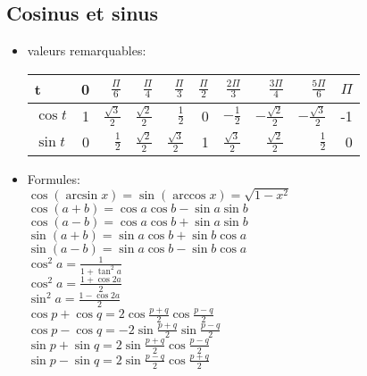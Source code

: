 \documentclass[fleqn]{article}
\theoremstyle{definition} \newtheorem*{defi}{D\'efinition}
\theoremstyle{definition} \newtheorem*{theo}{Th\'eor\`eme}
\begin{document}
\subsection{Cosinus et sinus}
\begin{itemize}
	\item valeurs remarquables:\\
		\begin{tabular}{@{}lrrrrrrrrr@{}}
			\toprule
			t & 0 & $\frac{\Pi}{6}$ & $\frac{\Pi}{4}$ & $\frac{\Pi}{3}$ & $\frac{\Pi}{2}$ & $\frac{2\Pi}{3}$ & $\frac{3\Pi}{4}$
				& $\frac{5\Pi}{6}$ & $\Pi$ \\
			\hline
			$\cos t$ & 1 & $\frac{\sqrt{3}}{2}$ & $\frac{\sqrt{2}}{2}$ & $\frac{1}{2}$ & 0 & $-\frac{1}{2}$ & $-\frac{\sqrt{2}}{2}$
				& $-\frac{\sqrt{3}}{2}$ & -1 \\
			$\sin t$ & 0 & $\frac{1}{2}$ & $\frac{\sqrt{2}}{2}$ & $\frac{\sqrt{3}}{2}$ & 1 & $\frac{\sqrt{3}}{2}$ & $\frac{\sqrt{2}}{2}$
				& $\frac{1}{2}$ & 0 \\
			\bottomrule
		\end{tabular}

	\item Formules: \\
		$\cos(\arcsin x) = \sin(\arccos x) = \sqrt{1 - x^2}$ \\
		$\cos (a+b) = \cos a\cos b - \sin a\sin b$ \\
		$\cos (a-b) = \cos a\cos b + \sin a\sin b$ \\
		$\sin (a+b) = \sin a\cos b + \sin b\cos a$ \\
		$\sin (a-b) = \sin a\cos b - \sin b\cos a$ \\
		$\cos^2 a = \frac{1}{1 + \tan^2a}$ \\
		$\cos^2 a = \frac{1 + \cos 2a}{2}$ \\
		$\sin^2 a = \frac{1 - \cos 2a}{2}$ \\
		\newline
		$\cos p + \cos q = 2\cos\frac{p+q}{2}\cos\frac{p-q}{2}$ \\
		$\cos p - \cos q = -2\sin\frac{p+q}{2}\sin\frac{p-q}{2}$ \\
		$\sin p + \sin q = 2\sin\frac{p+q}{2}\cos\frac{p-q}{2}$ \\
		$\sin p - \sin q = 2\sin\frac{p-q}{2}\cos\frac{p+q}{2}$ \\
\end{itemize}
\end{document}
